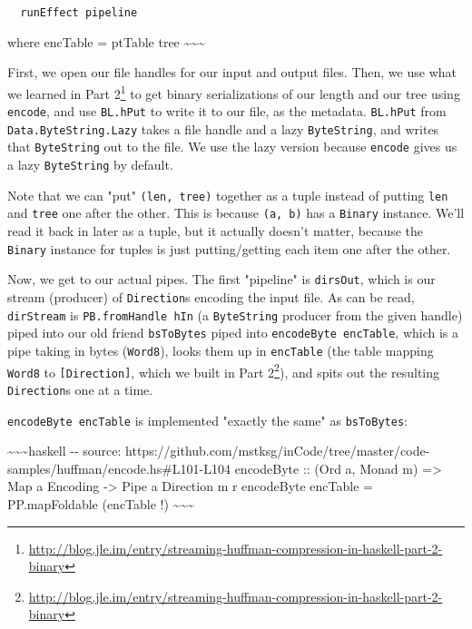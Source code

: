 \documentclass[]{article}
\renewcommand{\href}[2]{#2\footnote{\url{#1}}}
\begin{document}
\begin{verbatim}
  runEffect pipeline
\end{verbatim}

where encTable = ptTable tree
\textasciitilde{}\textasciitilde{}\textasciitilde{}

First, we open our file handles for our input and output files. Then, we use
what we learned in
\href{http://blog.jle.im/entry/streaming-huffman-compression-in-haskell-part-2-binary}{Part
2} to get binary serializations of our length and our tree using
\texttt{encode}, and use \texttt{BL.hPut} to write it to our file, as the
metadata. \texttt{BL.hPut} from \texttt{Data.ByteString.Lazy} takes a file
handle and a lazy \texttt{ByteString}, and writes that \texttt{ByteString} out
to the file. We use the lazy version because \texttt{encode} gives us a lazy
\texttt{ByteString} by default.

Note that we can "put" \texttt{(len,\ tree)} together as a tuple instead of
putting \texttt{len} and \texttt{tree} one after the other. This is because
\texttt{(a,\ b)} has a \texttt{Binary} instance. We'll read it back in later as
a tuple, but it actually doesn't matter, because the \texttt{Binary} instance
for tuples is just putting/getting each item one after the other.

Now, we get to our actual pipes. The first "pipeline" is \texttt{dirsOut}, which
is our stream (producer) of \texttt{Direction}s encoding the input file. As can
be read, \texttt{dirStream} is \texttt{PB.fromHandle\ hIn} (a
\texttt{ByteString} producer from the given handle) piped into our old friend
\texttt{bsToBytes} piped into \texttt{encodeByte\ encTable}, which is a pipe
taking in bytes (\texttt{Word8}), looks them up in \texttt{encTable} (the table
mapping \texttt{Word8} to \texttt{{[}Direction{]}}, which we built in
\href{http://blog.jle.im/entry/streaming-huffman-compression-in-haskell-part-2-binary}{Part
2}), and spits out the resulting \texttt{Direction}s one at a time.

\texttt{encodeByte\ encTable} is implemented "exactly the same" as
\texttt{bsToBytes}:

\textasciitilde{}\textasciitilde{}\textasciitilde{}haskell -\/- source:
https://github.com/mstksg/inCode/tree/master/code-samples/huffman/encode.hs\#L101-L104
encodeByte :: (Ord a, Monad m) =\textgreater{} Map a Encoding -\textgreater{}
Pipe a Direction m r encodeByte encTable = PP.mapFoldable (encTable !)
\textasciitilde{}\textasciitilde{}\textasciitilde{}
\end{document}
